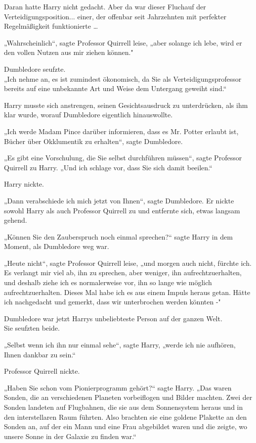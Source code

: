 {Daran hatte Harry nicht gedacht. Aber da war dieser Fluchauf der Verteidigungsposition... einer, der offenbar seit Jahrzehnten mit perfekter Regelmäßigkeit funktionierte …

„Wahrscheinlich“, sagte Professor Quirrell leise, „aber solange ich lebe, wird er den vollen Nutzen aus mir ziehen können."

Dumbledore seufzte.\\ „Ich nehme an, es ist zumindest ökonomisch, da Sie als Verteidigungsprofessor bereits auf eine unbekannte Art und Weise dem Untergang geweiht sind.“

Harry musste sich anstrengen, seinen Gesichtsausdruck zu unterdrücken, als ihm klar wurde, worauf Dumbledore eigentlich hinauswollte.

„Ich werde Madam Pince darüber informieren, dass es Mr. Potter erlaubt ist, Bücher über Okklumentik zu erhalten“, sagte Dumbledore.

„Es gibt eine Vorschulung, die Sie selbst durchführen müssen“, sagte Professor Quirrell zu Harry. „Und ich schlage vor, dass Sie sich damit beeilen.“

Harry nickte.

„Dann verabschiede ich mich jetzt von Ihnen“, sagte Dumbledore. Er nickte\\ sowohl Harry als auch Professor Quirrell zu und entfernte sich, etwas langsam gehend.

„Können Sie den Zauberspruch noch einmal sprechen?“ sagte Harry in dem Moment, als Dumbledore weg war.

„Heute nicht“, sagte Professor Quirrell leise, „und morgen auch nicht, fürchte ich. Es verlangt mir viel ab, ihn zu sprechen, aber weniger, ihn aufrechtzuerhalten, und deshalb ziehe ich es normalerweise vor, ihn so lange wie möglich aufrechtzuerhalten. Dieses Mal habe ich es aus einem Impuls heraus getan. Hätte ich nachgedacht und gemerkt, dass wir unterbrochen werden könnten -"

Dumbledore war jetzt Harrys unbeliebteste Person auf der ganzen Welt.\\ Sie seufzten beide.

„Selbst wenn ich ihn nur einmal sehe“, sagte Harry, „werde ich nie aufhören, Ihnen dankbar zu sein.“

Professor Quirrell nickte.

„Haben Sie schon vom Pionierprogramm gehört?“ sagte Harry. „Das waren Sonden, die an verschiedenen Planeten vorbeiflogen und Bilder machten. Zwei der Sonden landeten auf Flugbahnen, die sie aus dem Sonnensystem heraus und in den interstellaren Raum führten. Also brachten sie eine goldene Plakette an den Sonden an, auf der ein Mann und eine Frau abgebildet waren und die zeigte, wo unsere Sonne in der Galaxie zu finden war.“

}
